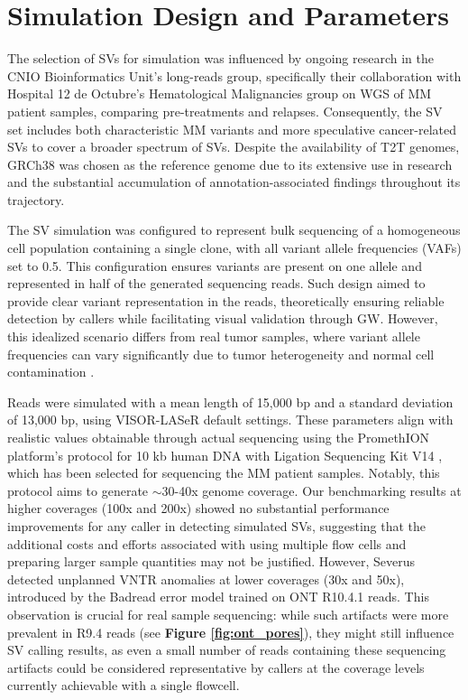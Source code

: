\section{Simulation Design and Parameters}

The selection of SVs for simulation was influenced by ongoing research in the 
CNIO Bioinformatics Unit's long-reads group, specifically their collaboration 
with Hospital 12 de Octubre's Hematological Malignancies group on WGS of MM 
patient samples, comparing pre-treatments and relapses. Consequently, the SV 
set includes both characteristic MM variants and more speculative cancer-related 
SVs to cover a broader spectrum of SVs. Despite the availability of 
T2T genomes, GRCh38 was chosen as the reference genome due to its extensive use 
in research and the substantial accumulation of annotation-associated findings 
throughout its trajectory.

The SV simulation was configured to represent bulk sequencing of a homogeneous 
cell population containing a single clone, with all variant allele frequencies 
(VAFs) set to 0.5. This configuration ensures variants are present on one allele 
and represented in half of the generated sequencing reads. Such design aimed to 
provide clear variant representation in the reads, theoretically ensuring 
reliable detection by callers while facilitating visual validation through GW. 
However, this idealized scenario differs from real tumor samples, where variant 
allele frequencies can vary significantly due to tumor heterogeneity and normal 
cell contamination \cite{dagogo-jack_tumour_2018}.

Reads were simulated with a mean length of 15,000 bp and a standard deviation of 
13,000 bp, using VISOR-LASeR default settings. These parameters align with 
realistic values obtainable through actual sequencing using the PromethION 
platform's protocol for 10 kb human DNA with Ligation Sequencing Kit V14 
\cite{noauthor_ligation_2022}, which has been selected for sequencing the MM
patient samples. Notably, this protocol aims to generate $\sim$30-40x genome 
coverage. Our benchmarking results at higher coverages (100x and 200x) showed 
no substantial performance improvements for any caller in detecting simulated 
SVs, suggesting that the additional costs and efforts associated with using 
multiple flow cells and preparing larger sample quantities may not be justified. 
However, Severus detected unplanned VNTR anomalies at lower coverages (30x and 50x), 
introduced by the Badread error model trained on ONT R10.4.1 reads. This 
observation is crucial for real sample sequencing: while such artifacts were 
more prevalent in R9.4 reads (see \textbf{Figure \ref{fig:ont_pores}}), 
they might still influence SV calling results, as even a small number of reads 
containing these sequencing artifacts could be considered representative by 
callers at the coverage levels currently achievable with a single flowcell.

